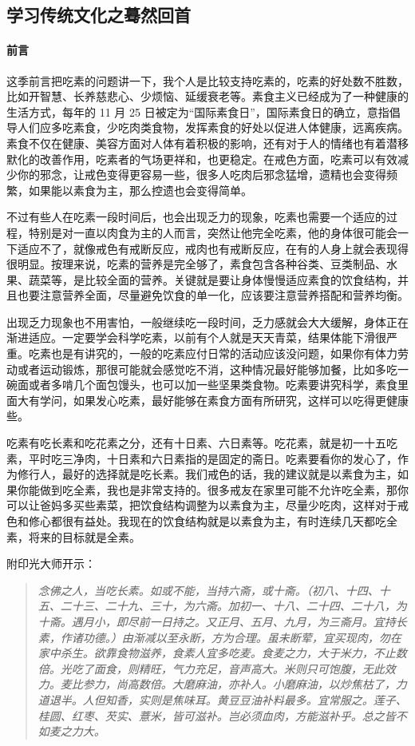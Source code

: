 \subsection{学习传统文化之蓦然回首}\label{81}

\paragraph*{前言}

这季前言把吃素的问题讲一下，我个人是比较支持吃素的，吃素的好处数不胜数，比如开智慧、长养慈悲心、少烦恼、延缓衰老等。素食主义已经成为了一种健康的生活方式，每年的 11 月 25 日被定为“国际素食日”，国际素食日的确立，意指倡导人们应多吃素食，少吃肉类食物，发挥素食的好处以促进人体健康，远离疾病。素食不仅在健康、美容方面对人体有着积极的影响，还有对于人的情绪也有着潜移默化的改善作用，吃素者的气场更祥和，也更稳定。在戒色方面，吃素可以有效减少你的邪念，让戒色变得更容易一些，很多人吃肉后邪念猛增，遗精也会变得频繁，如果能以素食为主，那么控遗也会变得简单。

不过有些人在吃素一段时间后，也会出现乏力的现象，吃素也需要一个适应的过程，特别是对一直以肉食为主的人而言，突然让他完全吃素，他的身体很可能会一下适应不了，就像戒色有戒断反应，戒肉也有戒断反应，在有的人身上就会表现得很明显。按理来说，吃素的营养是完全够了，素食包含各种谷类、豆类制品、水果、蔬菜等，是比较全面的营养。关键就是要让身体慢慢适应素食的饮食结构，并且也要注意营养全面，尽量避免饮食的单一化，应该要注意营养搭配和营养均衡。

出现乏力现象也不用害怕，一般继续吃一段时间，乏力感就会大大缓解，身体正在渐进适应。一定要学会科学吃素，以前有个人就是天天青菜，结果体能下滑很严重。吃素也是有讲究的，一般的吃素应付日常的活动应该没问题，如果你有体力劳动或者运动锻炼，那很可能就会感觉吃不消，这种情况最好能够加餐，比如多吃一碗面或者多啃几个面包馒头，也可以加一些坚果类食物。吃素要讲究科学，素食里面大有学问，如果发心吃素，最好能够在素食方面有所研究，这样可以吃得更健康些。

吃素有吃长素和吃花素之分，还有十日素、六日素等。吃花素，就是初一十五吃素，平时吃三净肉，十日素和六日素指的是固定的斋日。吃素要看你的发心了，作为修行人，最好的选择就是吃长素。我们戒色的话，我的建议就是以素食为主，如果你能做到吃全素，我也是非常支持的。很多戒友在家里可能不允许吃全素，那你可以让爸妈多买些素菜，把饮食结构调整为以素食为主，尽量少吃肉，这样对于戒色和修心都很有益处。我现在的饮食结构就是以素食为主，有时连续几天都吃全素，将来的目标就是全素。

附印光大师开示：

\begin{quote}\it
    念佛之人，当吃长素。如或不能，当持六斋，或十斋。（初八、十四、十五、二十三、二十九、三十，为六斋。加初一、十八、二十四、二十八，为十斋。遇月小，即尽前一日持之。又正月、五月、九月，为三斋月。宜持长素，作诸功德。）由渐减以至永断，方为合理。虽未断荤，宜买现肉，勿在家中杀生。欲靠食物滋养，食素人宜多吃麦。食麦之力，大于米力，不止数倍。光吃了面食，则精旺，气力充足，音声高大。米则只可饱腹，无此效力。麦比参力，尚高数倍。大磨麻油，亦补人。小磨麻油，以炒焦枯了，力道退半。人但知香，实则是焦味耳。黄豆豆油补料最多。宜常服之。莲子、桂圆、红枣、芡实、薏米，皆可滋补。岂必须血肉，方能滋补乎。总之皆不如麦之力大。
\end{quote}

